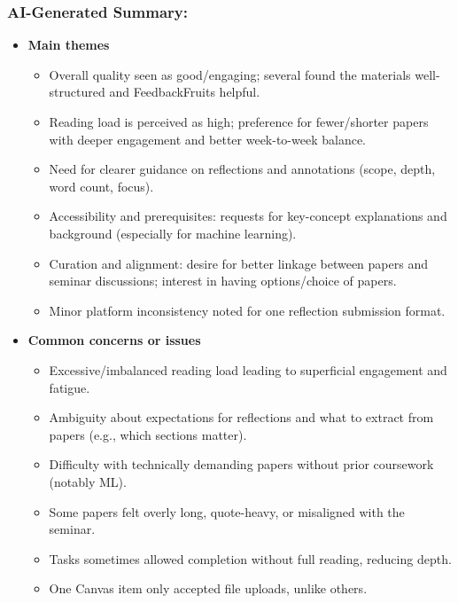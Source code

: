 \documentclass[a4paper]{report}
\begin{document}
\subsubsection{AI-Generated Summary:}

\begin{itemize}
\item \textbf{Main themes}
  \begin{itemize}
    \item Overall quality seen as good/engaging; several found the materials well-structured and FeedbackFruits helpful.
    \item Reading load is perceived as high; preference for fewer/shorter papers with deeper engagement and better week-to-week balance.
    \item Need for clearer guidance on reflections and annotations (scope, depth, word count, focus).
    \item Accessibility and prerequisites: requests for key-concept explanations and background (especially for machine learning).
    \item Curation and alignment: desire for better linkage between papers and seminar discussions; interest in having options/choice of papers.
    \item Minor platform inconsistency noted for one reflection submission format.
  \end{itemize}

\item \textbf{Common concerns or issues}
  \begin{itemize}
    \item Excessive/imbalanced reading load leading to superficial engagement and fatigue.
    \item Ambiguity about expectations for reflections and what to extract from papers (e.g., which sections matter).
    \item Difficulty with technically demanding papers without prior coursework (notably ML).
    \item Some papers felt overly long, quote-heavy, or misaligned with the seminar.
    \item Tasks sometimes allowed completion without full reading, reducing depth.
    \item One Canvas item only accepted file uploads, unlike others.
  \end{itemize}


\end{itemize}
\end{document}
